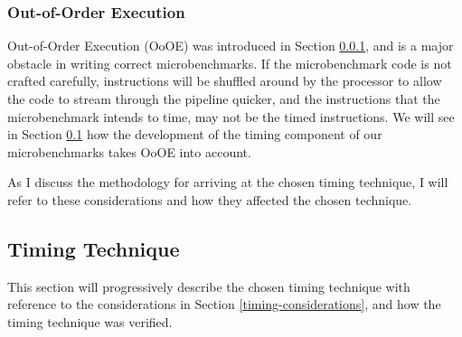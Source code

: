 \documentclass[bsc,frontabs,twoside,singlespacing,parskip,deptreport]{infthesis}     %
\begin{document}
\subsubsection{Out-of-Order Execution}\label{ooo-exec}
Out-of-Order Execution (OoOE) was introduced in Section \ref{ooo-exec}, and is a major obstacle in writing correct microbenchmarks. If the microbenchmark code is not crafted carefully, instructions will be shuffled around by the processor to allow the code to stream through the pipeline quicker, and the instructions that the microbenchmark intends to time, may not be the timed instructions. We will see in Section \ref{timing-technique} how the development of the timing component of our microbenchmarks takes OoOE into account.

As I discuss the methodology for arriving at the chosen timing technique, I will refer to these considerations and how they affected the chosen technique.

\subsection{Timing Technique}\label{timing-technique}
This section will progressively describe the chosen timing technique with reference to the considerations in Section \ref{timing-considerations}, and how the timing technique was verified.
\end{document}
